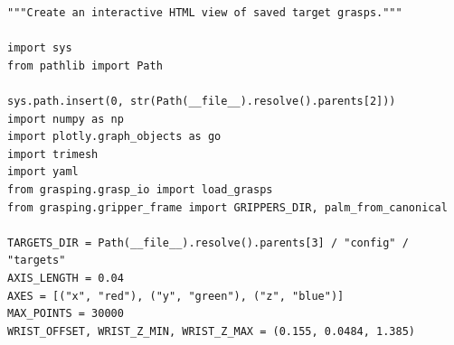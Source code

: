 \documentclass[11pt,a4paper]{book}
\begin{document}
\begin{lstlisting}[firstnumber=1]
"""Create an interactive HTML view of saved target grasps."""

import sys
from pathlib import Path

sys.path.insert(0, str(Path(__file__).resolve().parents[2]))
import numpy as np
import plotly.graph_objects as go
import trimesh
import yaml
from grasping.grasp_io import load_grasps
from grasping.gripper_frame import GRIPPERS_DIR, palm_from_canonical

TARGETS_DIR = Path(__file__).resolve().parents[3] / "config" / "targets"
AXIS_LENGTH = 0.04
AXES = [("x", "red"), ("y", "green"), ("z", "blue")]
MAX_POINTS = 30000
WRIST_OFFSET, WRIST_Z_MIN, WRIST_Z_MAX = (0.155, 0.0484, 1.385)


\end{lstlisting}
\end{document}
